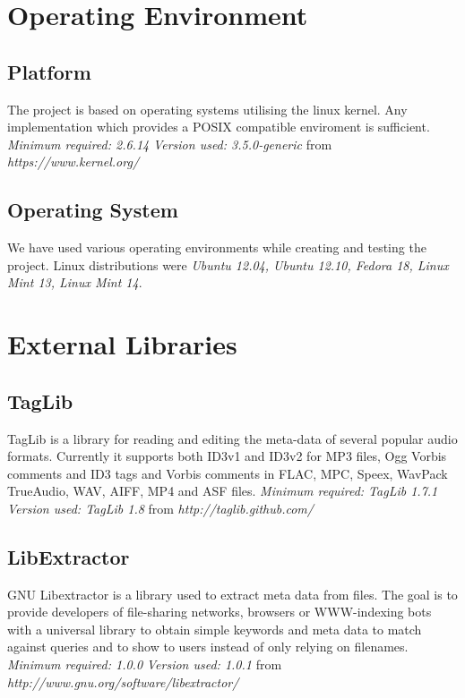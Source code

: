 \section {Operating Environment}
\subsection {Platform}
The project is based on operating systems utilising the linux kernel. Any implementation which provides a POSIX compatible enviroment is sufficient. \newline
\emph{Minimum required: 2.6.14} \newline
\emph{Version used: 3.5.0-generic} from \emph{https://www.kernel.org/}

\subsection {Operating System}
We have used various operating environments while creating and testing the project. Linux distributions were \emph{Ubuntu 12.04, Ubuntu 12.10, Fedora 18, Linux Mint 13, Linux Mint 14}.

\section {External Libraries}
\subsection{TagLib}
TagLib is a library for reading and editing the meta-data of several popular audio formats. Currently it supports both ID3v1 and ID3v2 for MP3 files, Ogg Vorbis comments and ID3 tags and Vorbis comments in FLAC, MPC, Speex, WavPack TrueAudio, WAV, AIFF, MP4 and ASF files. \newline
\emph{Minimum required: TagLib 1.7.1} \newline
\emph{Version used: TagLib 1.8} from \emph{http://taglib.github.com/}

\subsection{LibExtractor}
GNU Libextractor is a library used to extract meta data from files. The goal is to provide developers of file-sharing networks, browsers or WWW-indexing bots with a universal library to obtain simple keywords and meta data to match against queries and to show to users instead of only relying on filenames.  \newline
\emph{Minimum required: 1.0.0} \newline
\emph{Version used: 1.0.1} from \emph{http://www.gnu.org/software/libextractor/}

